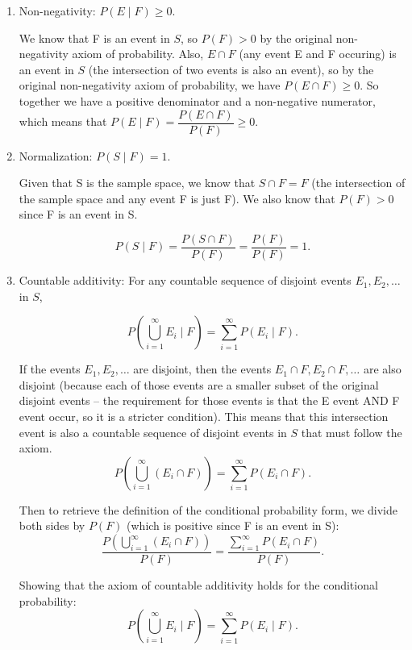 \documentclass[10pt]{article}
\begin{document}
\begin{enumerate}
	\item Non-negativity: $P(E \mid F) \ge 0$.

	      We know that F is an event in $S$, so $P(F) >0$ by the original non-negativity axiom of probability. Also, $E \cap F$ (any event E and F occuring) is an event in $S$ (the intersection of two events is also an event), so by the original non-negativity axiom of probability, we have $P(E \cap F) \ge 0$. So together we have a positive denominator and a non-negative numerator, which means that $P(E \mid F) = \dfrac{P(E \cap F)}{P(F)} \ge 0$.

	\item Normalization: $P(S \mid F) = 1$.

	      Given that S is the sample space, we know that $S \cap F = F$ (the intersection of the sample space and any event F is just F). We also know that $P(F) > 0$ since F is an event in S.

	      \[
		      P(S \mid F) = \frac{P(S \cap F)}{P(F)} = \frac{P(F)}{P(F)} = 1.
	      \]

	\item Countable additivity: For any countable sequence of disjoint events $E_1,E_2,\ldots$ in $S$,

	      \[
		      P\left(\bigcup_{i=1}^\infty E_i \mid F\right) = \sum_{i=1}^\infty P(E_i \mid F).
	      \]

	      If the events $E_1,E_2,\ldots$ are disjoint, then the events $E_1 \cap F, E_2 \cap F, \ldots$ are also disjoint (because each of those events are a smaller subset of the original disjoint events -- the requirement for those events is that the E event AND F event occur, so it is a stricter condition). This means that this intersection event is also a countable sequence of disjoint events in $S$ that must follow the axiom.
	      \[
		      P\left(\bigcup_{i=1}^\infty (E_i \cap F)\right) = \sum_{i=1}^\infty P(E_i \cap F).
	      \]

	      Then to retrieve the definition of the conditional probability form, we divide both sides by $P(F)$ (which is positive since F is an event in S):
	      \[
		      \frac{P\left(\bigcup_{i=1}^\infty (E_i \cap F)\right)}{P(F)} = \frac{\sum_{i=1}^\infty P(E_i \cap F)}{P(F)}.
	      \]

	      Showing that the axiom of countable additivity holds for the conditional probability:
	      \[
		      P\left(\bigcup_{i=1}^\infty E_i \mid F\right) = \sum_{i=1}^\infty P(E_i \mid F).
	      \]
\end{enumerate}
\end{document}
